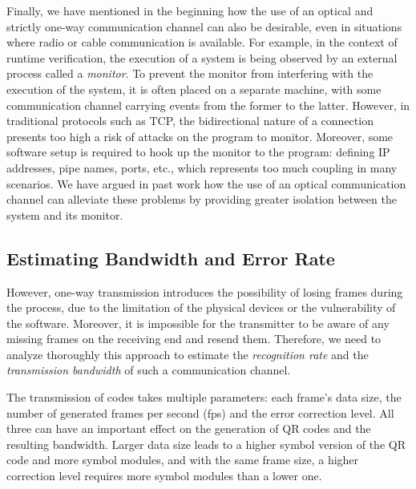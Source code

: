 \begin{comment}
Preliminary experiments show the technique can work on an inexpensive webcam with a low resolution of $640\times480$ (0.3 megapixels).
\end{comment}

Finally, we have mentioned in the beginning how the use of an optical and strictly one-way communication channel can also be desirable, even in situations where radio or cable communication is available. For example, in the context of runtime verification, the execution of a system is being observed by an external  process called a \emph{monitor}. To prevent the monitor from interfering with the execution of the system, it is often placed on a separate machine, with some communication channel carrying events from the former to the latter. However, in traditional protocols such as TCP, the bidirectional nature of a connection presents too high a risk of attacks on the program to monitor. Moreover, some software setup is required to hook up the monitor to the program: defining IP addresses, pipe names, ports, etc., which represents too much coupling in many scenarios. We have argued in past work \citep{DBLP_conf/rv/LavoieLVGH14} how the use of an optical communication channel can alleviate these problems by providing greater isolation between the system and its monitor.

\subsection{Estimating Bandwidth and Error Rate}

However, one-way transmission introduces the possibility of losing frames during the process, due to the limitation of the physical devices or the vulnerability of the software. Moreover, it is impossible for the transmitter to be aware of any missing frames on the receiving end and resend them. Therefore, we need to analyze thoroughly this approach to estimate the \emph{recognition rate} and the \emph{transmission bandwidth} of such a communication channel.

The transmission of codes takes multiple parameters: each frame's data size, the number of generated frames per second (fps) and the error correction level. All three can have an important effect on the generation of QR codes and the resulting bandwidth. Larger data size leads to a higher symbol version of the QR code and more symbol modules, and with the same frame size, a higher correction level requires more symbol modules than a lower one.

